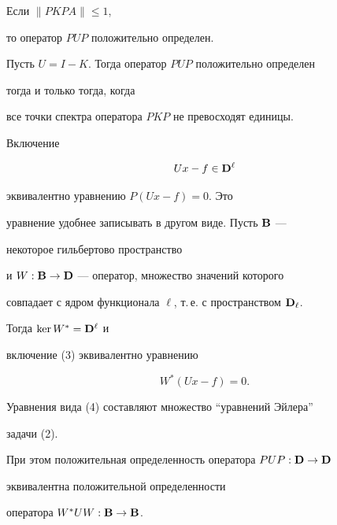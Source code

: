 \begin{cor}


Если $\|PKPA\|\le1$,


то оператор $PUP$ положительно определен.


\end{cor}





\begin{cor}


Пусть $U=I-K$. Тогда оператор $PUP$ положительно определен


тогда и только тогда, когда


все точки спектра оператора $PKP$ не превосходят единицы.


\end{cor}





Включение


\begin{equation}


Ux-f\in\spc{D}^\ell


\end{equation}


эквивалентно уравнению $P(Ux-f)=0$. Это


уравнение удобнее записывать в другом виде. Пусть $\bold B$ ---


некоторое гильбертово пространство


и $W:\bold B\to\bold D$ --- оператор, множество значений которого


совпадает с ядром функционала $\ell$, т.\,е. с пространством $\bold D_\ell$.


Тогда $\operatorname{ker} W^*=\bold D^\ell$ и


включение (3) эквивалентно уравнению


\begin{equation}


W^*(Ux-f)=0.


\end{equation}


Уравнения вида (4) составляют множество ``уравнений Эйлера''


задачи (2).


При этом положительная определенность оператора $PUP:\bold D\to\bold D$


эквивалентна положительной определенности


оператора $W^*UW:\bold B\to\bold B$.






